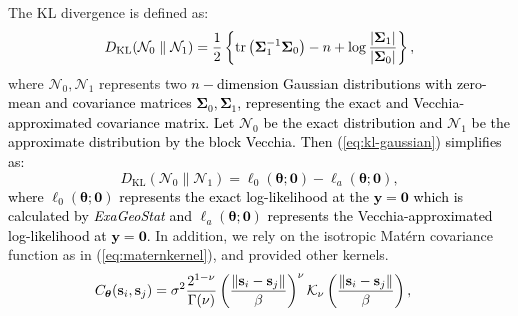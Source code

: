 \documentclass[12pt]{article}
\begin{document}
The KL divergence is defined as:
\begin{equation}
    D_{\text{KL}}({\mathcal {N}}_{0}\parallel {\mathcal {N}}_{1})={\frac{1}{2}}\left\{\operatorname {tr} \left({ {\boldsymbol \Sigma }}_{1}^{-1}{ {\boldsymbol \Sigma }}_{0}\right)-n+\log {|{ {\boldsymbol \Sigma }}_{1}| \over |{{\boldsymbol \Sigma }}_{0}|}\right\},
    \label{eq:kl-gaussian}
\end{equation}
where ${\mathcal {N}}_{0}, {\mathcal {N}}_{1}$ represents two \textcolor{black}{$n-$dimension Gaussian distributions with zero-mean and covariance matrices $\boldsymbol \Sigma_0,  \boldsymbol \Sigma_1$, representing the exact and Vecchia-approximated covariance matrix.
Let ${\mathcal {N}}_{0}$ be the exact distribution and ${\mathcal {N}}_{1}$ be the approximate distribution by the block Vecchia. Then (\ref{eq:kl-gaussian}) simplifies as:
\begin{equation}
    D_{\text{KL}}({\mathcal {N}}_{0}\parallel {\mathcal {N}}_{1})= \ell_0({\boldsymbol\theta};\boldsymbol{0}) - \ell_a({\boldsymbol\theta};\boldsymbol{0}),
    \label{eq:kl-gaussian-vecchia}
\end{equation}
where $\ell_0({\boldsymbol\theta};\boldsymbol{0})$ represents the exact log-likelihood at the $\mathbf{y} = \boldsymbol{0}$ which is calculated by {\em ExaGeoStat} and $\ell_a({\boldsymbol\theta};\boldsymbol{0})$ represents the Vecchia-approximated log-likelihood at $\mathbf{y} = \boldsymbol{0}$.}
In addition, we rely on the isotropic Matérn covariance function as in (\ref{eq:maternkernel}), and \cite{gneiting2002nonseparable} provided other kernels.
\begin{align}
    C_{\bm \theta}({\bf s}_i, {\bf s}_j)&=\sigma^2 \frac{2^{1-\nu}}{\Gamma(\nu)}\left(\frac{\|{\bf s}_i-{\bf s}_j\|}{\beta}\right)^\nu {\cal K}_\nu\left(\frac{\|{\bf s}_i-{\bf s}_j\|}{\beta}\right),
    \label{eq:maternkernel}
\end{align}
\end{document}
